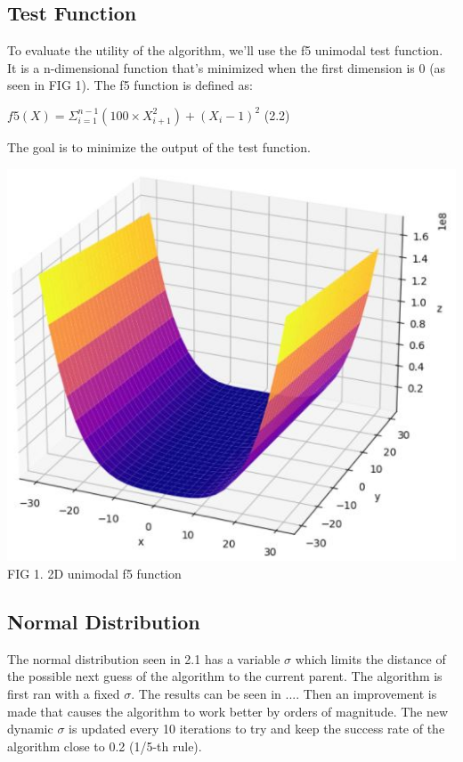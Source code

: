 \documentclass[letterpaper, 12 pt, conference]{ieeeconf}  %
\begin{document}
\subsection{Test Function}
To evaluate the utility of the algorithm, we'll use the f5 unimodal test function. It is a n-dimensional function that's minimized when the first dimension is 0 (as seen in FIG 1). The f5 function is defined as:
\begin{center}
    $f5(X) = \Sigma_{i=1}^{n-1}(100\times X_{i+1}^2)+(X_i-1)^2$                 (2.2)
\end{center}
The goal is to minimize the output of the test function.
\\
\begin{center}
\includegraphics[scale=0.5]{1.JPG}\\
FIG 1. 2D unimodal f5 function
\end{center}

\subsection{Normal Distribution}
The normal distribution seen in 2.1 has a variable $\sigma$ which limits the distance of the possible next guess of the algorithm to the current parent. The algorithm is first ran with a fixed $\sigma$. The results can be seen in .... Then an improvement is made that causes the algorithm to work better by orders of magnitude. The new dynamic $\sigma$ is updated every 10 iterations to try and keep the success rate of the algorithm close to 0.2 (1/5-th rule). 
\end{document}
